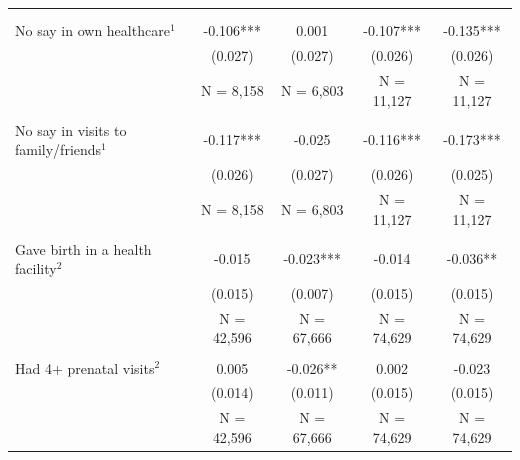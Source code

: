 \begin{tabular}{lcccc}
\toprule
 &  &  &  &  \\\\
\midrule
No say in own healthcare$^1$&-0.106***&0.001&-0.107***&-0.135***\\
&(0.027)&(0.027)&(0.026)&(0.026)\\
&N = 8,158&N = 6,803&N = 11,127&N = 11,127\\
&&&&\\
No say in visits to family/friends$^1$&-0.117***&-0.025&-0.116***&-0.173***\\
&(0.026)&(0.027)&(0.026)&(0.025)\\
&N = 8,158&N = 6,803&N = 11,127&N = 11,127\\
&&&&\\
Gave birth in a health facility$^2$&-0.015&-0.023***&-0.014&-0.036**\\
&(0.015)&(0.007)&(0.015)&(0.015)\\
&N = 42,596&N = 67,666&N = 74,629&N = 74,629\\
&&&&\\
Had 4+ prenatal visits$^2$&0.005&-0.026**&0.002&-0.023\\
&(0.014)&(0.011)&(0.015)&(0.015)\\
&N = 42,596&N = 67,666&N = 74,629&N = 74,629\\
\bottomrule
\end{tabular}
